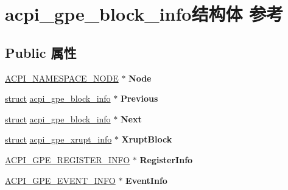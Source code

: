 \hypertarget{structacpi__gpe__block__info}{}\section{acpi\+\_\+gpe\+\_\+block\+\_\+info结构体 参考}
\label{structacpi__gpe__block__info}
\subsection*{Public 属性}
\begin{DoxyCompactItemize}
\item 
\mbox{\label{structacpi__gpe__block__info_aa19e0cd09efc7b2f42a679370293dc10}} 
\hyperlink{structacpi__namespace__node}{A\+C\+P\+I\+\_\+\+N\+A\+M\+E\+S\+P\+A\+C\+E\+\_\+\+N\+O\+DE} $\ast$ {\bfseries Node}
\item 
\mbox{\label{structacpi__gpe__block__info_a7f8cd5b7e970f41ab932add28854d606}} 
\hyperlink{interfacestruct}{struct} \hyperlink{structacpi__gpe__block__info}{acpi\+\_\+gpe\+\_\+block\+\_\+info} $\ast$ {\bfseries Previous}
\item 
\mbox{\label{structacpi__gpe__block__info_a9e6c2b97f8923f099117ffcb14bddaae}} 
\hyperlink{interfacestruct}{struct} \hyperlink{structacpi__gpe__block__info}{acpi\+\_\+gpe\+\_\+block\+\_\+info} $\ast$ {\bfseries Next}
\item 
\mbox{\label{structacpi__gpe__block__info_ae52b7e5744d85606c4184fc4270d7a32}} 
\hyperlink{interfacestruct}{struct} \hyperlink{structacpi__gpe__xrupt__info}{acpi\+\_\+gpe\+\_\+xrupt\+\_\+info} $\ast$ {\bfseries Xrupt\+Block}
\item 
\mbox{\label{structacpi__gpe__block__info_a81aa820fe4c180c8951e0509ace3b811}} 
\hyperlink{structacpi__gpe__register__info}{A\+C\+P\+I\+\_\+\+G\+P\+E\+\_\+\+R\+E\+G\+I\+S\+T\+E\+R\+\_\+\+I\+N\+FO} $\ast$ {\bfseries Register\+Info}
\item 
\mbox{\label{structacpi__gpe__block__info_abad592ed999477f2423f667d7cf3c541}} 
\hyperlink{structacpi__gpe__event__info}{A\+C\+P\+I\+\_\+\+G\+P\+E\+\_\+\+E\+V\+E\+N\+T\+\_\+\+I\+N\+FO} $\ast$ {\bfseries Event\+Info}

\end{DoxyCompactItemize}
